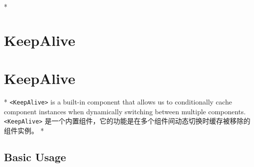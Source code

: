 \begin{paracol}{2}
 
\switchcolumn[0]*%
\section{KeepAlive}
\switchcolumn
\section{KeepAlive}
\switchcolumn[0]*%
\texttt{\textless{}KeepAlive\textgreater{}} is a built-in component that
allows us to conditionally cache component instances when dynamically
switching between multiple components.
\switchcolumn
\texttt{\textless{}KeepAlive\textgreater{}}
是一个内置组件，它的功能是在多个组件间动态切换时缓存被移除的组件实例。
\switchcolumn[0]*%
\subsection{Basic Usage}
\switchcolumn

\end{paracol}
